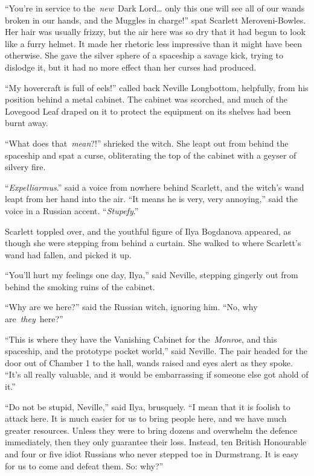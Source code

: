 ``You're in service to the~\emph{new}~Dark Lord\ldots{} only this one
will see all of our wands broken in our hands, and the Muggles in
charge!'' spat Scarlett Meroveni-Bowles. Her hair was usually frizzy,
but the air here was so dry that it had begun to look like a furry
helmet. It made her rhetoric less impressive than it might have been
otherwise. She gave the silver sphere of a spaceship a savage kick,
trying to dislodge it, but it had no more effect than her curses had
produced.

``My hovercraft is full of eels!'' called back Neville Longbottom,
helpfully, from his position behind a metal cabinet. The cabinet was
scorched, and much of the Lovegood Leaf draped on it to protect the
equipment on its shelves had been burnt away.

``What does that~\emph{mean}?!'' shrieked the witch. She leapt out from
behind the spaceship and spat a curse, obliterating the top of the
cabinet with a geyser of silvery fire.

``\emph{Expelliarmus}.'' said a voice from nowhere behind Scarlett, and
the witch's wand leapt from her hand into the air. ``It means he is
very, very annoying,'' said the voice in a Russian accent.
``\emph{Stupefy}.''

Scarlett toppled over, and the youthful figure of Ilya Bogdanova
appeared, as though she were stepping from behind a curtain. She walked
to where Scarlett's wand had fallen, and picked it up.

``You'll hurt my feelings one day, Ilya,'' said Neville, stepping
gingerly out from behind the smoking ruins of the cabinet.

``Why are we here?'' said the Russian witch, ignoring him. ``No, why
are~\emph{they}~here?''

``This is where they have the Vanishing Cabinet for the~\emph{Monroe},
and this spaceship, and the prototype pocket world,'' said Neville. The
pair headed for the door out of Chamber 1 to the hall, wands raised and
eyes alert as they spoke. ``It's all really valuable, and it would be
embarrassing if someone else got ahold of it.''

``Do not be stupid, Neville,'' said Ilya, brusquely. ``I mean that it is
foolish to attack here. It is much easier for us to bring people here,
and we have much greater resources. Unless they were to bring dozens and
overwhelm the defence immediately, then they only guarantee their loss.
Instead, ten British Honourable and four or five idiot Russians who
never stepped toe in Durmstrang. It is easy for us to come and defeat
them. So: why?''

